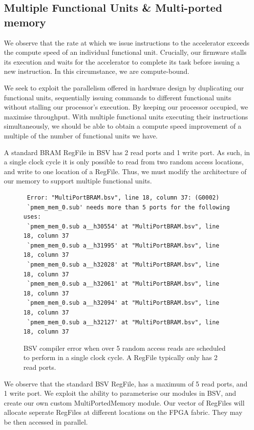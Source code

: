 \documentclass[a4paper,8pt]{report}
\begin{document}
\subsection{Multiple Functional Units \& Multi-ported memory}
We observe that the rate at which we issue instructions to the accelerator
exceeds the compute speed of an individual functional unit. Crucially, our firmware stalls
its execution and waits for the accelerator to complete its task before issuing
a new instruction. In this circumstance, we are compute-bound.

We seek to exploit the parallelism offered in hardware design by duplicating our
functional units, sequentially issuing commands to different functional units
without stalling our processor's execution. By keeping our processor occupied,
we maximise throughput. With multiple functional units executing their
instructions simultaneously, we should be able to obtain a compute speed
improvement of a multiple of the number of functional units we have.

A standard BRAM RegFile in BSV has 2 read ports and 1 write port. As such, in a
single clock cycle it is only possible to read from two random access locations,
and write to one location of a RegFile. Thus, we must modify the architecture of
our memory to support multiple functional units.

\begin{figure}[h]
\scriptsize
\begin{verbatim}
 Error: "MultiPortBRAM.bsv", line 18, column 37: (G0002)
 `pmem_mem_0.sub' needs more than 5 ports for the following uses:
 `pmem_mem_0.sub a__h30554' at "MultiPortBRAM.bsv", line 18, column 37
 `pmem_mem_0.sub a__h31995' at "MultiPortBRAM.bsv", line 18, column 37
 `pmem_mem_0.sub a__h32028' at "MultiPortBRAM.bsv", line 18, column 37
 `pmem_mem_0.sub a__h32061' at "MultiPortBRAM.bsv", line 18, column 37
 `pmem_mem_0.sub a__h32094' at "MultiPortBRAM.bsv", line 18, column 37
 `pmem_mem_0.sub a__h32127' at "MultiPortBRAM.bsv", line 18, column 37
\end{verbatim}
\normalsize
\caption{BSV compiler error when over 5 random access reads are scheduled to
  perform in a single clock cycle. A RegFile typically only has 2 read ports.}
\end{figure}

We observe that the standard BSV RegFile, has a maximum of 5 read ports, and 1
write port. We exploit the ability to parameterise our modules in BSV, and
create our own custom MultiPortedMemory module. Our vector of RegFiles will
allocate seperate RegFiles at different locations on the FPGA fabric. They may
be then accessed in parallel.
\end{document}

